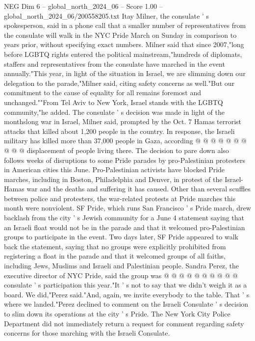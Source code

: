 \begin{textsample}{NEG Dim 6 – global\_north\_2024\_06 – Score 1.00 – global\_north\_2024\_06/200558205.txt}  \label{ex:f6_neg_312}
Itay Milner, the consulate ' s spokesperson, said in a phone call that a smaller number of representatives from the consulate will walk in the NYC Pride March on Sunday in comparison to years prior, without specifying exact numbers.
Milner said that since 2007,"long before LGBTQ rights entered the political mainstream,"hundreds of diplomats, staffers and representatives from the consulate have marched in the event annually."This year, in light of the situation in Israel, we are slimming down our delegation to the parade,"Milner said, citing safety concerns as well."But our commitment to the cause of equality for all remains foremost and unchanged.""From Tel Aviv to New York, Israel stands with the LGBTQ community,"he added.
The consulate ' s decision was made in light of the monthslong war in Israel, Milner said, prompted by the Oct. 7 Hamas terrorist attacks that killed about 1,200 people in the country.
In response, the Israeli military has killed more than 37,000 people in Gaza, according @ @ @ @ @ @ @ @ @ @ displacement of people living there.
The decision to pare down also follows weeks of disruptions to some Pride parades by pro-Palestinian protesters in American cities this June.
Pro-Palestinian activists have blocked Pride marches, including in Boston, Philadelphia and Denver, in protest of the Israel-Hamas war and the deaths and suffering it has caused.
Other than several scuffles between police and protesters, the war-related protests at Pride marches this month were nonviolent.
SF Pride, which runs San Francisco ' s Pride march, drew backlash from the city ' s Jewish community for a June 4 statement saying that an Israeli float would not be in the parade and that it welcomed pro-Palestinian groups to participate in the event.
Two days later, SF Pride appeared to walk back the statement, saying that no groups were explicitly prohibited from registering a float in the parade and that it welcomed groups of all faiths, including Jews, Muslims and Israeli and Palestinian people.
Sandra Perez, the executive director of NYC Pride, said the group was @ @ @ @ @ @ @ @ @ @ consulate ' s participation this year."It ' s not to say that we didn't weigh it as a board.
We did,"Perez said."And, again, we invite everybody to the table.
That ' s where we landed."Perez declined to comment on the Israeli Consulate ' s decision to slim down its operations at the city ' s Pride.
The New York City Police Department did not immediately return a request for comment regarding safety concerns for those marching with the Israeli Consulate.

\end{textsample}
